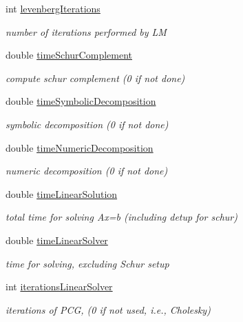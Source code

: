 \begin{DoxyCompactItemize}
int \mbox{\hyperlink{structg2o_1_1_g2_o_batch_statistics_acd6b82e7401ec8c04e00b14bf76892a9}{levenberg\+Iterations}}
\begin{DoxyCompactList}\small\item\em number of iterations performed by LM \end{DoxyCompactList}\item 
double \mbox{\hyperlink{structg2o_1_1_g2_o_batch_statistics_a79d8935c9af46d716ef2b85b777fabe1}{time\+Schur\+Complement}}
\begin{DoxyCompactList}\small\item\em compute schur complement (0 if not done) \end{DoxyCompactList}\item 
double \mbox{\hyperlink{structg2o_1_1_g2_o_batch_statistics_a456a521ccb1e4c69940475a92a1f5d29}{time\+Symbolic\+Decomposition}}
\begin{DoxyCompactList}\small\item\em symbolic decomposition (0 if not done) \end{DoxyCompactList}\item 
double \mbox{\hyperlink{structg2o_1_1_g2_o_batch_statistics_a31f4a361dba1f3eb8dba2ca2aa326905}{time\+Numeric\+Decomposition}}
\begin{DoxyCompactList}\small\item\em numeric decomposition (0 if not done) \end{DoxyCompactList}\item 
double \mbox{\hyperlink{structg2o_1_1_g2_o_batch_statistics_a01fea9876aab94b1e69a6a03c20fd98f}{time\+Linear\+Solution}}
\begin{DoxyCompactList}\small\item\em total time for solving Ax=b (including detup for schur) \end{DoxyCompactList}\item 
double \mbox{\hyperlink{structg2o_1_1_g2_o_batch_statistics_adb423c3dac9262b7f4a315bbb108464a}{time\+Linear\+Solver}}
\begin{DoxyCompactList}\small\item\em time for solving, excluding Schur setup \end{DoxyCompactList}\item 
int \mbox{\hyperlink{structg2o_1_1_g2_o_batch_statistics_a0ef94423b56f6d842e33a7c277c930a0}{iterations\+Linear\+Solver}}
\begin{DoxyCompactList}\small\item\em iterations of P\+CG, (0 if not used, i.\+e., Cholesky) \end{DoxyCompactList}\item 

\end{DoxyCompactItemize}
